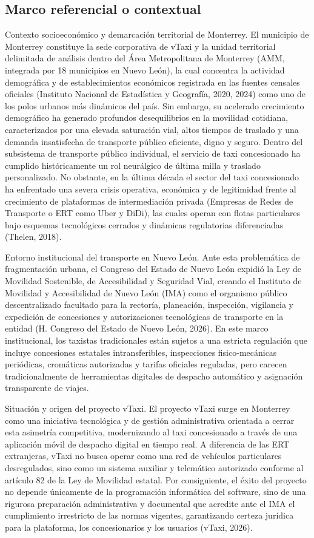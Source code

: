 {\subsection{Marco referencial o contextual}
Contexto socioeconómico y demarcación territorial de Monterrey. El municipio de Monterrey constituye la sede corporativa de vTaxi y la unidad territorial delimitada de análisis dentro del Área Metropolitana de Monterrey (AMM, integrada por 18 municipios en Nuevo León), la cual concentra la actividad demográfica y de establecimientos económicos registrada en las fuentes censales oficiales (Instituto Nacional de Estadística y Geografía, 2020, 2024) como uno de los polos urbanos más dinámicos del país. Sin embargo, su acelerado crecimiento demográfico ha generado profundos desequilibrios en la movilidad cotidiana, caracterizados por una elevada saturación vial, altos tiempos de traslado y una demanda insatisfecha de transporte público eficiente, digno y seguro. Dentro del subsistema de transporte público individual, el servicio de taxi concesionado ha cumplido históricamente un rol neurálgico de última milla y traslado personalizado. No obstante, en la última década el sector del taxi concesionado ha enfrentado una severa crisis operativa, económica y de legitimidad frente al crecimiento de plataformas de intermediación privada (Empresas de Redes de Transporte o ERT como Uber y DiDi), las cuales operan con flotas particulares bajo esquemas tecnológicos cerrados y dinámicas regulatorias diferenciadas (Thelen, 2018).


Entorno institucional del transporte en Nuevo León. Ante esta problemática de fragmentación urbana, el Congreso del Estado de Nuevo León expidió la Ley de Movilidad Sostenible, de Accesibilidad y Seguridad Vial, creando el Instituto de Movilidad y Accesibilidad de Nuevo León (IMA) como el organismo público descentralizado facultado para la rectoría, planeación, inspección, vigilancia y expedición de concesiones y autorizaciones tecnológicas de transporte en la entidad (H. Congreso del Estado de Nuevo León, 2026). En este marco institucional, los taxistas tradicionales están sujetos a una estricta regulación que incluye concesiones estatales intransferibles, inspecciones fisico-mecánicas periódicas, cromáticas autorizadas y tarifas oficiales reguladas, pero carecen tradicionalmente de herramientas digitales de despacho automático y asignación transparente de viajes.


Situación y origen del proyecto vTaxi. El proyecto vTaxi surge en Monterrey como una iniciativa tecnológica y de gestión administrativa orientada a cerrar esta asimetría competitiva, modernizando al taxi concesionado a través de una aplicación móvil de despacho digital en tiempo real. A diferencia de las ERT extranjeras, vTaxi no busca operar como una red de vehículos particulares desregulados, sino como un sistema auxiliar y telemático autorizado conforme al artículo 82 de la Ley de Movilidad estatal. Por consiguiente, el éxito del proyecto no depende únicamente de la programación informática del software, sino de una rigurosa preparación administrativa y documental que acredite ante el IMA el cumplimiento irrestricto de las normas vigentes, garantizando certeza jurídica para la plataforma, los concesionarios y los usuarios (vTaxi, 2026).


}
